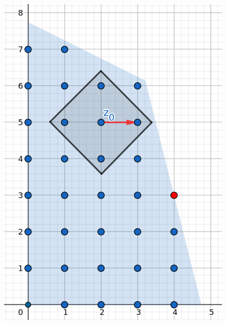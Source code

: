 \documentclass{beamer}
\begin{document}
\begin{frame}
\begin{columns}[T]
\begin{column}{.48\textwidth}
            \includegraphics[width=0.85\textwidth]{images/IP(6).png}
        \end{column}%
        \end{columns}
    \end{frame}
    
\end{document}
